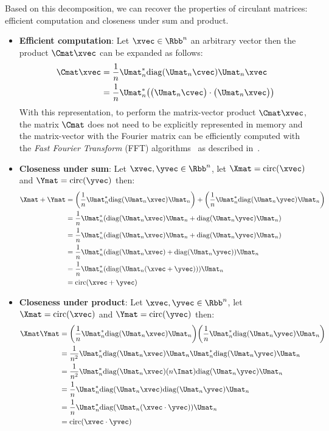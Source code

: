 \noindent
Based on this decomposition, we can recover the properties of circulant matrices: efficient computation and closeness under sum and product.
\begin{itemize}
  \item \textbf{Efficient computation}: Let $\xvec \in \Rbb^n$ an arbitrary vector then the product $\Cmat \xvec$ can be expanded as follows:
  \begin{align}
    \Cmat \xvec &= \frac{1}{n} \Umat_n^* \diag(\Umat_n \cvec) \Umat_n \xvec  \\
    &= \frac{1}{n} \Umat_n^* \left( \big(\Umat_n \cvec \big) \cdot \big( \Umat_n \xvec \big) \right)
  \end{align}
  With this representation, to perform the matrix-vector product $\Cmat \xvec$, the matrix $\Cmat$ does not need to be explicitly represented in memory and the matrix-vector with the Fourier matrix can be efficiently computed with the \emph{Fast Fourier Transform} (FFT) algorithms~\cite{cooley1965algorithm} as described in~.
  \item \textbf{Closeness under sum}: Let $\xvec, \yvec \in \Rbb^n$, let $\Xmat= \circulant(\xvec)$ and $\Ymat = \circulant(\yvec)$ then:
    \begin{align}
      \Xmat + \Ymat &= \left( \frac{1}{n} \Umat_n^* \diag(\Umat_n \xvec) \Umat_n \right) + \left( \frac{1}{n} \Umat_n^* \diag(\Umat_n \yvec) \Umat_n \right) \\
      &= \frac{1}{n}  \Umat_n^* \left( \diag(\Umat_n \xvec) \Umat_n  + \diag(\Umat_n \yvec) \Umat_n \right) \\
      &= \frac{1}{n}  \Umat_n^* \left( \diag(\Umat_n \xvec) \Umat_n  + \diag(\Umat_n \yvec) \Umat_n \right) \\
      &= \frac{1}{n}  \Umat_n^* \left( \diag(\Umat_n \xvec) + \diag(\Umat_n \yvec) \right) \Umat_n  \\
      &= \frac{1}{n}  \Umat_n^* \left( \diag(\Umat_n (\xvec + \yvec)) \right) \Umat_n  \\
      &= \circulant(\xvec + \yvec)
    \end{align}
  \item \textbf{Closeness under product}: Let $\xvec, \yvec \in \Rbb^n$, let $\Xmat= \circulant(\xvec)$ and $\Ymat = \circulant(\yvec)$ then:
    \begin{align}
      \Xmat \Ymat &= \left( \frac{1}{n} \Umat_n^* \diag(\Umat_n \xvec) \Umat_n \right) \left( \frac{1}{n} \Umat_n^* \diag(\Umat_n \yvec) \Umat_n \right) \\
      &= \frac{1}{n^2}  \Umat_n^* \diag(\Umat_n \xvec) \Umat_n \Umat_n^* \diag(\Umat_n \yvec) \Umat_n  \\
      &= \frac{1}{n^2}  \Umat_n^* \diag(\Umat_n \xvec) (n \Imat) \diag(\Umat_n \yvec) \Umat_n  \\
      &= \frac{1}{n}  \Umat_n^* \diag(\Umat_n \xvec) \diag(\Umat_n \yvec) \Umat_n  \\
      &= \frac{1}{n}  \Umat_n^* \diag(\Umat_n (\xvec \cdot \yvec)) \Umat_n  \\
      &= \circulant(\xvec \cdot \yvec)
    \end{align}
\end{itemize}

